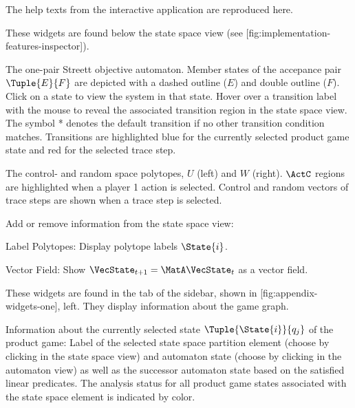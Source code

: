 The help texts from the interactive application are reproduced here.


\startsubject[title=View Widgets]

    These widgets are found below the state space view (see [fig:implementation-features-inspector]).

    \startsubsubject[title={Widget: Objective Automaton}]

        The one-pair Streett objective automaton.
        Member states of the accepance pair $\Tuple{E}{F}$ are depicted with a dashed outline ($E$) and double outline ($F$).
        Click on a state to view the system in that state.
        Hover over a transition label with the mouse to reveal the associated transition region in the state space view.
        The symbol * denotes the default transition if no other transition condition matches.
        Transitions are highlighted blue for the currently selected product game state and red for the selected trace step.

    \stopsubsubject

    \startsubsubject[title={Widget: Control and Random Space}]

        The control- and random space polytopes, $U$ (left) and $W$ (right).
        $\ActC$ regions are highlighted when a player 1 action is selected.
        Control and random vectors of trace steps are shown when a trace step is selected.

    \stopsubsubject

    \startsubsubject[title={Widget: View Settings}]

        Add or remove information from the state space view:

        \startitemize[packed]
            \item{Label Polytopes: Display polytope labels $\State{i}$.}
            \item{Vector Field: Show $\VecState_{t+1} = \MatA \VecState_{t}$ as a vector field.}
        \stopitemize

    \stopsubsubject

\stopsubject


\startsubject[title={State Widgets}]

    These widgets are found in the  tab of the sidebar, shown in [fig:appendix-widgets-one], left.
    They display information about the game graph.

    \startsubsubject[title={Widget: Selection}]
        Information about the currently selected state $\Tuple{\State{i}}{q_j}$ of the product game:
        Label of the selected state space partition element (choose by clicking in the state space view) and automaton state (choose by clicking in the automaton view) as well as the successor automaton state based on the satisfied linear predicates.
        The analysis status for all product game states associated with the state space element is indicated by color.

